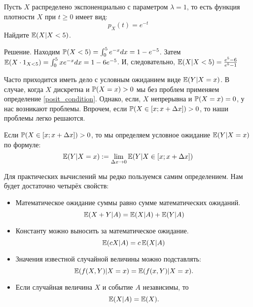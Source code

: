 \begin{myex} Пусть $ X $ распределено экспоненциально с параметром $ \lambda=1 $, то есть функция плотности $ X $ при $ t\geq 0 $ имеет вид:
\[ p_{X}(t)=e^{-t} \]
Найдите $ \E(X|X<5) $.

Решение. Находим $ \P(X<5)=\int_{0}^{5}e^{-x}dx=1-e^{-5} $. Затем $ \E(X\cdot 1_{X<5})=\int_{0}^{5} xe^{-x}dx=1-6e^{-5} $. И, следовательно, $ \E(X|X<5)=\frac{e^{5}-6}{e^{5}-1} $

\end{myex}


Часто приходится иметь дело с условным ожиданием виде $ \E(Y|X=x) $. В случае, когда $ X $ дискретна и $ \P(X=x)>0 $ мы без проблем применяем определение \ref{posit_condition}. Однако, если, $ X $ непрерывна и $ \P(X=x)=0 $, у нас возникают проблемы. Впрочем, если $ \P(X\in [x;x+\Delta x])>0$, то наши проблемы легко решаются.
\begin{mydef}
Если $ \P(X\in [x;x+\Delta x])>0 $, то мы определяем условное ожидание $ \E(Y|X=x) $ по формуле:
\begin{equation}
\E(Y|X=x):=\lim_{\Delta x\to 0}\E(Y|X\in [x;x+\Delta x])
\end{equation}
\end{mydef}

Для практических вычислений мы редко пользуемся самим определением. Нам будет достаточно четырёх свойств:

\begin{itemize}
\item Математическое ожидание суммы равно сумме математических ожиданий.
\begin{equation}
\E(X+Y|A)=\E(X|A)+\E(Y|A)
\end{equation}
\item Константу можно выносить за математическое ожидание.
\begin{equation}
\E(cX|A)=c\E(X|A)
\end{equation}
\item Значения известной случайной величины можно подставлять:
\begin{equation}
\E(f(X,Y)|X=x)=\E(f(x,Y)|X=x).
\end{equation}
\item Если случайная величина $ X $ и событие $ A $ независимы, то
\begin{equation}
\E(X|A)=\E(X).
\end{equation}

\end{itemize}

